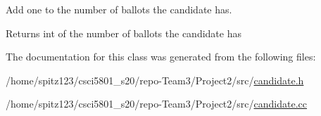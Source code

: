 Add one to the number of ballots the candidate has. 

\begin{DoxyReturn}{Returns}
int of the number of ballots the candidate has 
\end{DoxyReturn}


The documentation for this class was generated from the following files\+:\begin{DoxyCompactItemize}
\item 
/home/spitz123/csci5801\+\_\+s20/repo-\/\+Team3/\+Project2/src/\hyperlink{candidate_8h}{candidate.\+h}\item 
/home/spitz123/csci5801\+\_\+s20/repo-\/\+Team3/\+Project2/src/\hyperlink{candidate_8cc}{candidate.\+cc}\end{DoxyCompactItemize}
